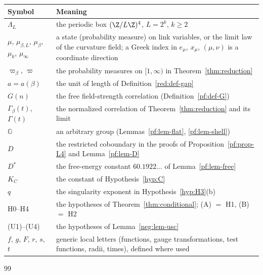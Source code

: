 \begin{center}
\small
\begin{tabular}{@{}p{}p{}@{}}
\toprule
Symbol & Meaning \\
\midrule
$\Lambda_L$ & the periodic box $(\Z/L\Z)^4$, $L=2^k$, $k\ge2$ \\
$\mu$, $\mu_{\beta,L}$, $\mu_\beta$, $\mu_k$, $\mu_\infty$ & a state (probability measure) on link variables, or the limit law of the curvature field; a Greek index in $e_\mu$, $x_\mu$, $(\mu,\nu)$ is a coordinate direction \\
$\varpi_\beta$, $\varpi$ & the probability measures on $[1,\infty)$ in Theorem~\ref{thm:reduction} \\
$a=a(\beta)$ & the unit of length of Definition~\ref{red:def-gap} \\
$G(n)$ & the free field-strength correlation (Definition~\ref{pf:def-G}) \\
$\Gamma_\beta(t)$, $\Gamma(t)$ & the normalized correlation of Theorem~\ref{thm:reduction} and its limit \\
$\mathbb G$ & an arbitrary group (Lemmas~\ref{pf:lem-flat}, \ref{pf:lem-shell}) \\
$D$ & the restricted coboundary in the proofs of Proposition~\ref{pf:prop-L4} and Lemma~\ref{pf:lem-D} \\
$D^*$ & the free-energy constant $60.1922\ldots$ of Lemma~\ref{pf:lem-free} \\
$K_C$ & the constant of Hypothesis~\ref{hyp:C} \\
$q$ & the singularity exponent in Hypothesis~\ref{hyp:H3}(b) \\
H0--H4 & the hypotheses of Theorem~\ref{thm:conditional}; (A) $=$ H1, (B) $=$ H2 \\
(U1)--(U4) & the hypotheses of Lemma~\ref{neg:lem-usc} \\
$f$, $g$, $F$, $r$, $s$, $t$ & generic local letters (functions, gauge transformations, test functions, radii, times), defined where used \\
\bottomrule
\end{tabular}
\end{center}







\begin{thebibliography}{99}

\end{thebibliography}

